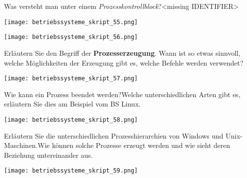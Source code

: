 \documentclass{article}
\begin{document}
\begin{tcolorbox}[colback=white!10!white,colframe=lightgray!75!black,
  savelowerto=\jobname_ex.tex,breakable,enhanced,lines before break=40]

\justifying
Was versteht man unter einem \textit{Prozesskontrollblock}?<missing IDENTIFIER>

\tcblower

\justifying
\begin{center}
\texttt{[image: betriebssysteme\_skript\_55.png]}
\end{center}
\begin{center}
\texttt{[image: betriebssysteme\_skript\_56.png]}
\end{center}

\end{tcolorbox}
\begin{tcolorbox}[colback=white!10!white,colframe=lightgray!75!black,
  savelowerto=\jobname_ex.tex,breakable,enhanced,lines before break=40]

\justifying
Erläutern Sie den Begriff der \textbf{Prozesserzeugung}. Wann ist so etwas sinnvoll, welche Möglichkeiten der Erzeugung gibt es, welche Befehle werden verwendet?

\tcblower

\justifying
\begin{center}
\texttt{[image: betriebssysteme\_skript\_57.png]}
\end{center}

\end{tcolorbox}
\begin{tcolorbox}[colback=white!10!white,colframe=lightgray!75!black,
  savelowerto=\jobname_ex.tex,breakable,enhanced,lines before break=40]

\justifying
Wie kann ein Prozess beendet werden?Welche unterschiedlichen Arten gibt es, erläutern Sie dies am Beispiel vom BS Linux.

\tcblower

\justifying
\begin{center}
\texttt{[image: betriebssysteme\_skript\_58.png]}
\end{center}

\end{tcolorbox}
\begin{tcolorbox}[colback=white!10!white,colframe=lightgray!75!black,
  savelowerto=\jobname_ex.tex,breakable,enhanced,lines before break=40]

\justifying
Erläutern Sie die unterschiedlichen Prozesshierarchien von Windows und Unix-Maschinen.Wie können solche Prozesse erzeugt werden und wie sieht deren Beziehung untereinander aus.

\tcblower

\justifying
\begin{center}
\texttt{[image: betriebssysteme\_skript\_59.png]}
\end{center}

\end{tcolorbox}
\end{document}
